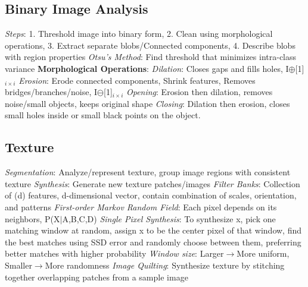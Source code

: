 \documentclass{article}
\begin{document}
\begin{multicols*}{2}
        \subsection*{Binary Image Analysis}
        \textit{Steps}: 1. Threshold image into binary form, 2. Clean using morphological operations, 3. Extract
        separate blobs/Connected components, 4. Describe blobs with region properties\newline
        \textit{Otsu's Method}: Find threshold that minimizes intra-class variance\newline
        \textbf{Morphological Operations}:\newline
        \textit{Dilation}: Closes gaps and fills holes, I$\oplus$[1]$_{i\times i}$\newline
        \textit{Erosion}: Erode connected components, Shrink features, Removes bridges/branches/noise,
        I$\ominus$[1]$_{i\times i}$\newline
        \textit{Opening}: Erosion then dilation, removes noise/small objects, keeps original shape\newline
        \textit{Closing}: Dilation then erosion, closes small holes inside or small black points on the object.\newline
        \subsection*{Texture}
        \textit{Segmentation}: Analyze/represent texture, group image regions with consistent texture\newline
        \textit{Synthesis}: Generate new texture patches/images\newline
        \textit{Filter Banks}: Collection of (d) features, d-dimensional vector, contain combination of scales,
        orientation, and patterns\newline
        \textit{First-order Markov Random Field}: Each pixel depends on its neighbors, P(X$\mid$A,B,C,D)\newline
        \textit{Single Pixel Synthesis}: To synthesize x, pick one matching window at random, assign x to be the
        center pixel of that window, find the best matches using SSD error and randomly choose between them,
        preferring better matches with higher probability\newline
        \textit{Window size}: Larger$\rightarrow$More uniform, Smaller$\rightarrow$More randomness\newline
        \textit{Image Quilting}: Synthesize texture by stitching together overlapping patches from a sample image\newline

\end{multicols*}
\end{document}
